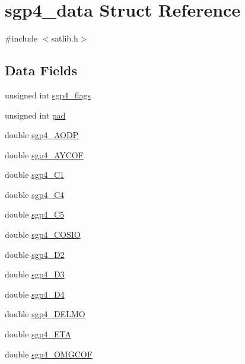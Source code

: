 \hypertarget{structsgp4__data}{\section{sgp4\-\_\-data Struct Reference}
\label{structsgp4__data}
}


{\ttfamily \#include $<$satlib.\-h$>$}

\subsection*{Data Fields}
\begin{DoxyCompactItemize}
\item 
unsigned int \hyperlink{structsgp4__data_ad2c653bf404da1f8cd71b1570435c988}{sgp4\-\_\-flags}
\item 
unsigned int \hyperlink{structsgp4__data_a2117bfe04c91b6b4232bafd5ef928561}{pad}
\item 
double \hyperlink{structsgp4__data_aa2d4b2dec5c1e4516155d62f60f00802}{sgp4\-\_\-\-A\-O\-D\-P}
\item 
double \hyperlink{structsgp4__data_acc26c407f2444fb3f8fb139c285ba3ca}{sgp4\-\_\-\-A\-Y\-C\-O\-F}
\item 
double \hyperlink{structsgp4__data_a79b7bc60972ac0c469516ce93e1399d2}{sgp4\-\_\-\-C1}
\item 
double \hyperlink{structsgp4__data_aa12851802bc654472e447da7fc48088b}{sgp4\-\_\-\-C4}
\item 
double \hyperlink{structsgp4__data_a208d5c222fb10621dfe6fad7c2c78abe}{sgp4\-\_\-\-C5}
\item 
double \hyperlink{structsgp4__data_a5d43c67edb80a3e15b251f6792c6b222}{sgp4\-\_\-\-C\-O\-S\-I\-O}
\item 
double \hyperlink{structsgp4__data_afc21e64f4c8ce2fb1163ffdac7fdc9b8}{sgp4\-\_\-\-D2}
\item 
double \hyperlink{structsgp4__data_a711e799a5f092af2739fc0240c716b5b}{sgp4\-\_\-\-D3}
\item 
double \hyperlink{structsgp4__data_ad992dcf93a4683e135e901c6ed08886e}{sgp4\-\_\-\-D4}
\item 
double \hyperlink{structsgp4__data_ab590ea761a20f350d40ee7475493c6af}{sgp4\-\_\-\-D\-E\-L\-M\-O}
\item 
double \hyperlink{structsgp4__data_ac5cf1b16a0d7d907e601090f97d66f4a}{sgp4\-\_\-\-E\-T\-A}
\item 
double \hyperlink{structsgp4__data_a547296bc502e383ce1141540bf4e384e}{sgp4\-\_\-\-O\-M\-G\-C\-O\-F}
\item 

\end{DoxyCompactItemize}
